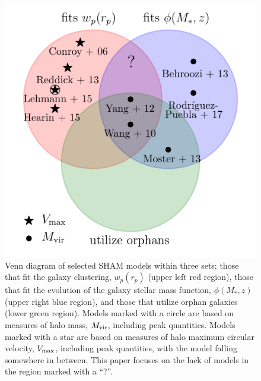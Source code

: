 \documentclass[useAMS,fleqn,usenatbib]{mnras}
\begin{document}
\begin{figure}
    \includegraphics[width=\columnwidth]{figures/SHAM_models_venn_diagram.pdf}
    \caption{Venn diagram of selected SHAM models within three sets; those that fit the galaxy clustering, $w_p(r_p)$ (upper left red region), those that fit the evolution of the galaxy stellar mass function, $\phi(M_*,z)$ (upper right blue region), and those that utilize orphan galaxies (lower green region).  Models marked with a circle are based on measures of halo mass, $M_{\rm vir}$, including peak quantities.  Models marked with a star are based on measures of halo maximum circular velocity, $V_{\rm max}$, including peak quantities, with the \citet{Lehmann:2017fy} model falling somewhere in between.   This paper focuses on the lack of models in the region marked with a ``?''. }
    \label{fig:venn_diagram}
\end{figure}
\end{document}
